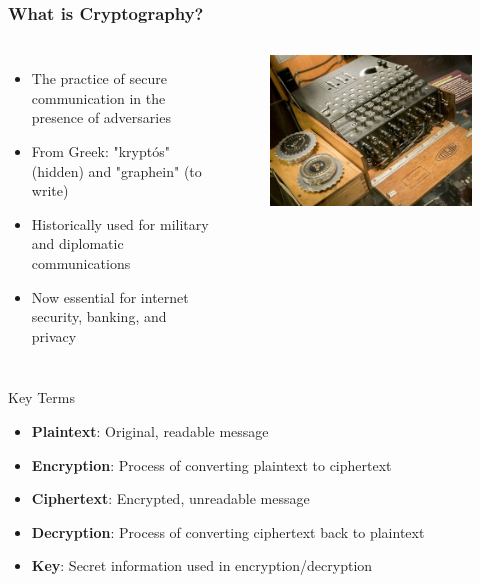 \documentclass{beamer}
\begin{document}
\begin{frame}
    \frametitle{What is Cryptography?}
    \begin{columns}
    \begin{itemize}
        \item The practice of secure communication in the presence of adversaries
        \item From Greek: "kryptós" (hidden) and "graphein" (to write)
        \item Historically used for military and diplomatic communications
        \item Now essential for internet security, banking, and privacy
    \end{itemize}
    
    \begin{figure}
        \centering
        \includegraphics[width=0.8\linewidth]{th-1232469891.jpg}
    \end{figure}
    \end{columns}
    
    \begin{block}{Key Terms}
        \begin{itemize}
            \item \textbf{Plaintext}: Original, readable message
            \item \textbf{Encryption}: Process of converting plaintext to ciphertext
            \item \textbf{Ciphertext}: Encrypted, unreadable message
            \item \textbf{Decryption}: Process of converting ciphertext back to plaintext
            \item \textbf{Key}: Secret information used in encryption/decryption
        \end{itemize}
    \end{block}
\end{frame}
\end{document}
